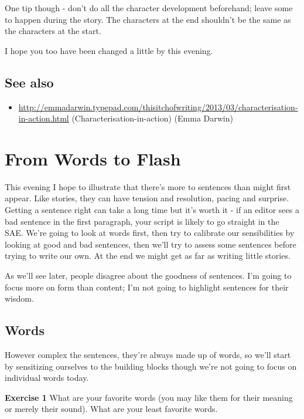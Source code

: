 \documentclass[11pt]{article}
\newenvironment{narrow}[2]{%
 \begin{list}{}{%
  \setlength{\topsep}{0pt}%
  \setlength{\leftmargin}{#1}%
  \setlength{\rightmargin}{#2}%
  \setlength{\listparindent}{\parindent}%
  \setlength{\itemindent}{\parindent}%
  \setlength{\parsep}{\parskip}%
 }%
\item[]}{\end{list}}
\begin{document}
One tip though - don't do all the character development beforehand; leave some to happen during the story. The characters at the end shouldn't be the same as the characters at the start.



I hope you too have been changed a little by this evening.



\subsection*{See also}
\begin{itemize}
\item \url{http://emmadarwin.typepad.com/thisitchofwriting/2013/03/characterisation-in-action.html} (Characterisation-in-action) (Emma Darwin) 
\end{itemize}
\newpage
\section{From Words to Flash}

This evening I hope to illustrate that there's more to sentences than might first appear. Like stories, they can have tension and resolution, pacing and surprise. Getting a sentence right can take a long time but it's worth it - if an editor sees a bad sentence in the first paragraph, your script is likely to go straight in the SAE. We're going to look at words first, then try to calibrate our sensibilities by looking at good and bad sentences, then we'll try to assess some sentences before trying to write our own. At the end we might get as far as writing little stories.


As we'll see later, people disagree about the goodness of sentences. I'm going to focus more on form than content; I'm not going to highlight sentences for their wisdom.



\subsection*{Words}
However complex the sentences, they're always made up of words, so we'll start by sensitizing ourselves to the building blocks though we're not going to focus on individual words today.





\begin{narrow}{1.0cm}{1.0cm}
\textbf{Exercise 1} What are your favorite words (you may like them for their meaning or merely their sound). What are your least favorite words.
\end{narrow}
\end{document}
